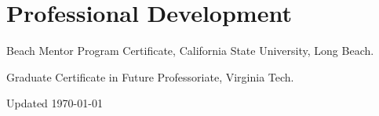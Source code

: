 \documentclass[11pt,letterpaper]{report}
\begin{document}



    \section*{Professional Development}

    \begin{tablist}

 
          \item[2025] \tab{} Beach Mentor Program Certificate, California State University, Long Beach.
          \item[2018] \tab{} Graduate Certificate in Future Professoriate, Virginia Tech. 

    \end{tablist}



    \begin{center}
        \vfill
        Updated \monthyeardate\today
    \end{center}
\end{document}
